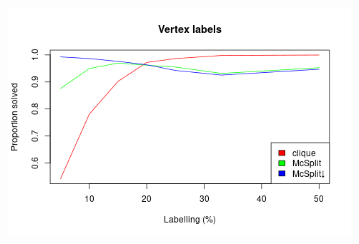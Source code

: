 \documentclass{beamer}
\begin{document}
\begin{frame} %
  \begin{columns}
    \begin{column}{0.5\textwidth}
      \begin{figure}
        \centering
        \includegraphics[width=\textwidth]{../dissertation/images/vertex_labels_linechart.png}
      \end{figure}
    \end{column}
    \begin{column}{0.5\textwidth}
      \begin{figure}
        \centering

\end{figure}
\end{column}
\end{columns}
\end{frame}
\end{document}
